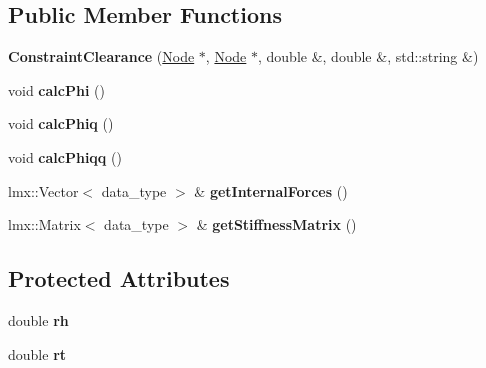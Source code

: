 \subsection*{Public Member Functions}
\begin{CompactItemize}
\item 
\hypertarget{classmknix_1_1ConstraintClearance_fcf63dc9c275d3ca6c55d072b2b554a2}{
\textbf{ConstraintClearance} (\hyperlink{classmknix_1_1Node}{Node} $\ast$, \hyperlink{classmknix_1_1Node}{Node} $\ast$, double \&, double \&, std::string \&)}
\label{classmknix_1_1ConstraintClearance_fcf63dc9c275d3ca6c55d072b2b554a2}

\item 
\hypertarget{classmknix_1_1ConstraintClearance_deab95be15eee6fe28f09fafd4f5757a}{
void \textbf{calcPhi} ()}
\label{classmknix_1_1ConstraintClearance_deab95be15eee6fe28f09fafd4f5757a}

\item 
\hypertarget{classmknix_1_1ConstraintClearance_7e834e62ef642f4f5207f3021f11020e}{
void \textbf{calcPhiq} ()}
\label{classmknix_1_1ConstraintClearance_7e834e62ef642f4f5207f3021f11020e}

\item 
\hypertarget{classmknix_1_1ConstraintClearance_ea75fa1da7455bbefb5ce7705a16a3cc}{
void \textbf{calcPhiqq} ()}
\label{classmknix_1_1ConstraintClearance_ea75fa1da7455bbefb5ce7705a16a3cc}

\item 
\hypertarget{classmknix_1_1ConstraintClearance_c190c9f0a3b0851681c6be643cb385ac}{
lmx::Vector$<$ data\_\-type $>$ \& \textbf{getInternalForces} ()}
\label{classmknix_1_1ConstraintClearance_c190c9f0a3b0851681c6be643cb385ac}

\item 
\hypertarget{classmknix_1_1ConstraintClearance_429d46f3f0c10e6a28b52b1beffa68e5}{
lmx::Matrix$<$ data\_\-type $>$ \& \textbf{getStiffnessMatrix} ()}
\label{classmknix_1_1ConstraintClearance_429d46f3f0c10e6a28b52b1beffa68e5}

\end{CompactItemize}
\subsection*{Protected Attributes}
\begin{CompactItemize}
\item 
\hypertarget{classmknix_1_1ConstraintClearance_d4bba99aa716d1f15bd9dc613f0352e8}{
double \textbf{rh}}
\label{classmknix_1_1ConstraintClearance_d4bba99aa716d1f15bd9dc613f0352e8}

\item 
\hypertarget{classmknix_1_1ConstraintClearance_07e6a50d3416e2265e2dadb1bf730c43}{
double \textbf{rt}}
\label{classmknix_1_1ConstraintClearance_07e6a50d3416e2265e2dadb1bf730c43}

\end{CompactItemize}


